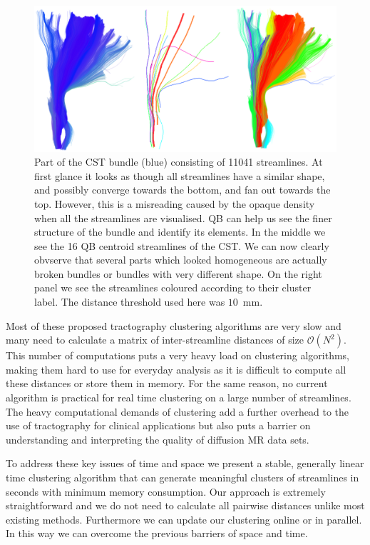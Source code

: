 \documentclass{bioinfo}
\begin{document}
%
\begin{figure}[htp]
\centerline{\includegraphics[width=160mm]{Figures/Fig_4_cst_simplification_relabeled_triple.eps}}
\caption{Part of the CST bundle (blue) consisting of \num{11041}
  streamlines. At first glance it looks as though all streamlines have a
  similar shape, and possibly converge towards the bottom, and fan out
  towards the top. However, this is a misreading caused by the opaque
  density when all the streamlines are visualised.  QB can help us see
  the finer structure of the bundle and identify its elements. In the
  middle we see the 16 QB centroid streamlines of the CST. We can
  now clearly obvserve that several parts which looked homogeneous are
  actually broken bundles or bundles with very different shape. On the
  right panel we see the streamlines coloured according to their cluster
  label. The distance threshold used here was
  $10$~mm. \label{Flo:cst_pbc}}
\end{figure}

Most of these proposed tractography clustering algorithms are very slow
and many need to calculate a matrix of inter-streamline distances of
size $\mathcal{O}(N^2)$.  This number of computations puts a very heavy
load on clustering algorithms, making them hard to use for everyday
analysis as it is difficult to compute all these distances or store them
in memory. For the same reason, no current algorithm is practical for
real time clustering on a large number of streamlines. The heavy
computational demands of clustering add a further overhead to the use of
tractography for clinical applications but also puts a barrier on
understanding and interpreting the quality of diffusion MR data sets.

To address these key issues of time and space we present a stable,
generally linear time clustering algorithm that can generate meaningful
clusters of streamlines in seconds with minimum memory consumption. Our
approach is extremely straightforward and we do not need to calculate
all pairwise distances unlike most existing methods. Furthermore we can
update our clustering online or in parallel. In this way we can overcome
the previous barriers of space and time.
\end{document}

